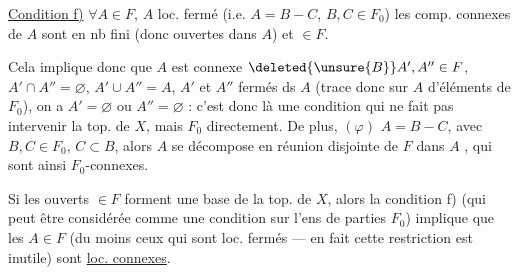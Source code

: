 
\uline{Condition f)} $\forall A\in F$, $A$ loc. fermé (i.e. $A=B-C$, $B,C\in F_0$) les comp. connexes de $A$ sont en nb fini (donc ouvertes dans $A$) et $\in F$.


Cela implique donc que $A$  est connexe   $\deleted{\unsure{B}}A',A''\in F$, $A'\cap A''=\varnothing$, $A'\cup A''=A$, $A'$ et $A''$ fermés ds $A$ (trace donc sur $A$ d'éléments de $F_0$), on a $A'=\varnothing$ ou $A''=\varnothing$ : c'est donc là une condition qui ne fait pas intervenir la top. de $X$, mais $F_0$ directement. De plus,  $(\varphi)$ $A=B-C$, avec $B,C\in F_0$, $C\subset B$, alors $A$ se décompose en réunion disjointe   de $F$  dans $A$ , qui sont ainsi $F_0$-connexes. 

Si les ouverts $\in F$ forment une base de la top. de $X$, alors la condition f) (qui peut être considérée comme une condition sur l'ens de parties $F_0$) implique que les $A\in F$ (du moins ceux qui sont loc. fermés --- en fait cette restriction est inutile) sont \uline{loc. connexes}.

